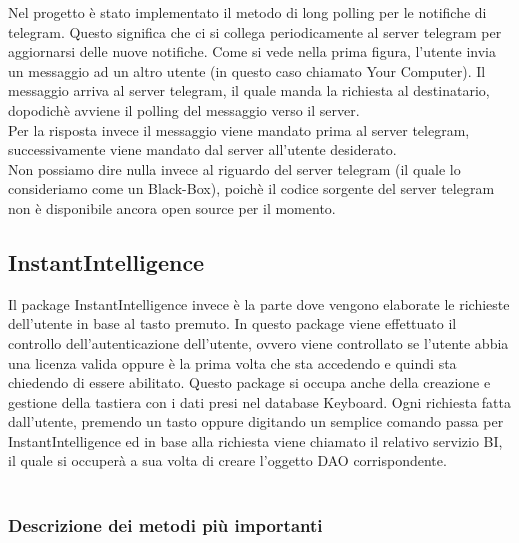 Nel progetto è stato implementato il metodo di long polling per le notifiche di telegram. Questo significa che ci si collega periodicamente al server telegram per aggiornarsi delle nuove notifiche. Come si vede nella prima figura, l'utente invia un messaggio ad un altro utente (in questo caso chiamato Your Computer). Il messaggio arriva al server telegram, il quale manda la richiesta al destinatario, dopodichè avviene il polling del messaggio verso il server. \\
Per la risposta invece il messaggio viene mandato prima al server telegram, successivamente viene mandato dal server all’utente desiderato.
\\Non possiamo dire nulla invece al riguardo del server telegram (il quale lo consideriamo come un Black-Box), poichè il codice sorgente del server telegram  non è disponibile ancora open source per il momento.


%


\subsection{InstantIntelligence}

Il package InstantIntelligence invece è la parte dove vengono elaborate le richieste dell'utente in base al tasto premuto. In questo package viene effettuato il controllo dell’autenticazione dell'utente, ovvero viene controllato se l’utente abbia una licenza valida oppure è la prima volta che sta accedendo e quindi sta chiedendo di essere abilitato.  Questo package si occupa anche della creazione e gestione della tastiera con i dati presi nel database Keyboard. Ogni richiesta fatta dall'utente, premendo un tasto oppure digitando un semplice comando passa per InstantIntelligence ed in base alla richiesta viene chiamato il relativo servizio BI, il quale si occuperà a sua volta di creare l'oggetto DAO corrispondente. \\\\

\subsubsection{Descrizione dei metodi più importanti}


